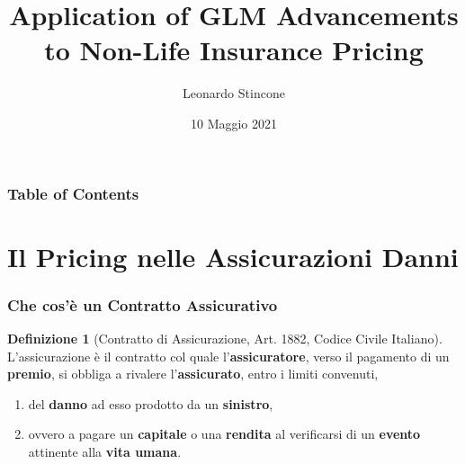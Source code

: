 \documentclass[pdf, aspectratio=169]{beamer}\usepackage[]{graphicx}\usepackage[]{color}
\title{Application of GLM Advancements \\ to Non-Life Insurance Pricing}
\author{Leonardo Stincone}
\date{10 Maggio 2021}
\institute[units]{Università degli Studi di Trieste}
\theoremstyle{definition}
\newtheorem{definizione}{Definizione}[section]
\begin{document}
\begin{frame}
\titlepage
\end{frame}





\begin{frame}
\frametitle{Table of Contents}

\tableofcontents


\end{frame}


\section{Il Pricing nelle Assicurazioni Danni}


\begin{frame}
\frametitle{Che cos'è un Contratto Assicurativo}

\begin{definizione}[{\normalsize Contratto di Assicurazione, Art. 1882, Codice Civile Italiano}]
  \label{def:ins-contr}
  L'assicurazione è il contratto col quale l'{\bfseries assicuratore}, verso il pagamento di un {\bfseries premio}, si obbliga a rivalere l'{\bfseries assicurato}, entro i limiti convenuti,
  
  \begin{enumerate}%
    \item del {\bfseries danno} ad esso prodotto da un {\bfseries sinistro},
    \item ovvero a pagare un {\bfseries capitale} o una {\bfseries rendita} al verificarsi di un {\bfseries evento} attinente alla {\bfseries vita umana}.
  \end{enumerate}
\end{definizione}


\end{frame}
\end{document}
